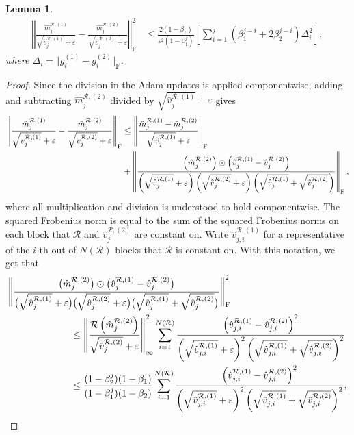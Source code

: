 \documentclass{article}
\newtheorem{lemma}[theorem]{Lemma}
\begin{document}
\begin{appendices}
\begin{lemma}
\begin{align*}
    \left\Vert\frac{\hat m^{\mathcal R,(1)}_j}{\sqrt{\hat v^{\mathcal R,(1)}_j}+\varepsilon} -\frac{\hat m^{\mathcal R,(2)}_j}{\sqrt{\hat v^{\mathcal R,(2)}_j}+\varepsilon} \right\Vert^2_\mathrm{F} &\le \frac{2(1-\beta_1)}{\varepsilon^2(1-\beta_1^j)}\left[\sum_{i=1}^j\left(\beta_1^{j-i}+2 \beta_2^{j-i}\right)\Delta^2_i \right],
\end{align*}
where $ \Delta_i = \Vert g^{(1)}_i-g^{(2)}_i\Vert_\mathrm{F}$.
\end{lemma}
\begin{proof}
Since the division in the Adam updates is applied componentwise, adding and subtracting $\hat m^{\mathcal{R},(2)}_j$ divided by $ \sqrt{\hat{v}_j^{\mathcal{R},(1)}}+\varepsilon$  gives
\begin{align}\label{eqn:AdamLip1}
   \left\Vert\frac{\hat m^{\mathcal R,(1)}_j}{\sqrt{v^{\mathcal R,(1)}_j}+\varepsilon} -\frac{\hat m^{\mathcal R,(2)}_j}{\sqrt{v^{\mathcal R,(2)}_j}+\varepsilon} \right\Vert_\mathrm{F} &\le \left\Vert\frac{\hat m^{\mathcal R,(1)}_j-\hat m^{\mathcal R,(2)}_j}{\sqrt{\hat v^{\mathcal R,(1)}_j}+\varepsilon}\right\Vert_\mathrm{F} \\&+ \left\Vert\frac{\left(\hat m^{\mathcal R,(2)}_j\right) \odot\left( \hat v^{\mathcal R,(1)}_j-\hat v^{\mathcal R,(2)}_j\right)}{\left(\sqrt{\hat v^{\mathcal R,(1)}_j}+\varepsilon\right)\left(\sqrt{\hat v^{\mathcal R,(2)}_j}+\varepsilon\right)\left(\sqrt{\hat v^{\mathcal R,(1)}_j}+\sqrt{\hat v^{\mathcal R,(2)}_j}\right)}\right\Vert_\mathrm{F},\notag
   \end{align}
   where all multiplication and division is understood to hold componentwise.
  The squared Frobenius norm is equal to the sum of the squared Frobenius norms on each block that $\mathcal R$ and $\hat v^{\mathcal R,(2)}_j$ are constant on. Write $\hat v^{\mathcal R,(1)}_{j,i}$ for a representative of the $i$-th out of $N(\mathcal R)$ blocks that $\mathcal R$ is constant on. With this notation, we get that
\begin{align}\label{eqn:bound_v1}
    \Bigg\Vert&\frac{\big(\hat m^{\mathcal R,(2)}_j\big) \odot\big( \hat v^{\mathcal R,(1)}_j-\hat v^{\mathcal R,(2)}_j\big)}{\big(\sqrt{\hat v^{\mathcal R,(1)}_j}+\varepsilon\big)\big(\sqrt{\hat v^{\mathcal R,(2)}_j}+\varepsilon\big)\big(\sqrt{\hat v^{\mathcal R,(1)}_j}+\sqrt{\hat v^{\mathcal R,(2)}_j}\big)}\Bigg\Vert^2_\mathrm{F}\\& \qquad\qquad\qquad\le \left\Vert \frac{\mathcal R\left(\hat m^{\mathcal R,(2)}_j\right)}{\sqrt{\hat v^{\mathcal R,(2)}_j}+\varepsilon}\right\Vert_\infty^2\sum_{i=1}^{N(\mathcal R)} \frac{\left( \hat v^{\mathcal R,(1)}_{j,i}-\hat v^{\mathcal R,(2)}_{j,i}\right)^2}{\left(\sqrt{\hat v^{\mathcal R,(1)}_{j,i}}+\varepsilon\right)^2\left(\sqrt{\hat v^{\mathcal R,(1)}_{j,i}}+\sqrt{\hat v^{\mathcal R,(2)}_{j,i}}\right)^2}\notag\\&\qquad\qquad\qquad\le\frac{(1-\beta_2^j)(1-\beta_1)}{(1-\beta_1^j)(1-\beta_2)}\sum_{i=1}^{N(\mathcal R)} \frac{\left( \hat v^{\mathcal R,(1)}_{j,i}-\hat v^{\mathcal R,(2)}_{j,i}\right)^2}{\left(\sqrt{\hat v^{\mathcal R,(1)}_{j,i}}+\varepsilon\right)^2\left(\sqrt{\hat v^{\mathcal R,(1)}_{j,i}}+\sqrt{\hat v^{\mathcal R,(2)}_{j,i}}\right)^2},\notag

\end{align}
\end{proof}
\end{appendices}
\end{document}
